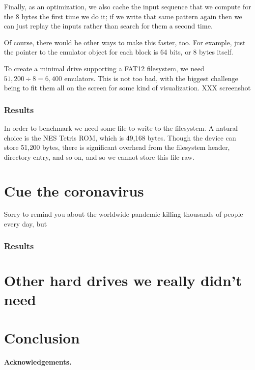 \documentclass[twocolumn]{article}
\begin{document}
Finally, as an optimization, we also cache the input sequence that we
compute for the 8 bytes the first time we do it; if we write that same
pattern again then we can just replay the inputs rather than search
for them a second time.

Of course, there would be other ways to make this faster, too. For
example, just the pointer to the emulator object for each block is 64
bits, or 8 bytes itself.

To create a minimal drive supporting a FAT12 filesystem, we need
$51,200 \div 8 = 6,400$ emulators. This is not too bad, with the
biggest challenge being to fit them all on the screen for some kind of
visualization. XXX screenshot

\subsubsection{Results}

In order to benchmark we need some file to write to the filesystem. A
natural choice is the NES Tetris ROM, which is 49,168 bytes. Though the
device can store 51,200 bytes, there is significant overhead from the
filesystem header, directory entry, and so on, and so we cannot store
this file raw. 

\section{Cue the coronavirus} \label{sec:cue}

Sorry to remind you about the worldwide pandemic killing thousands of
people every day, but

\subsubsection{Results}

\section{Other hard drives we really didn't need}

\section{Conclusion}

\paragraph{Acknowledgements.}
\end{document}
